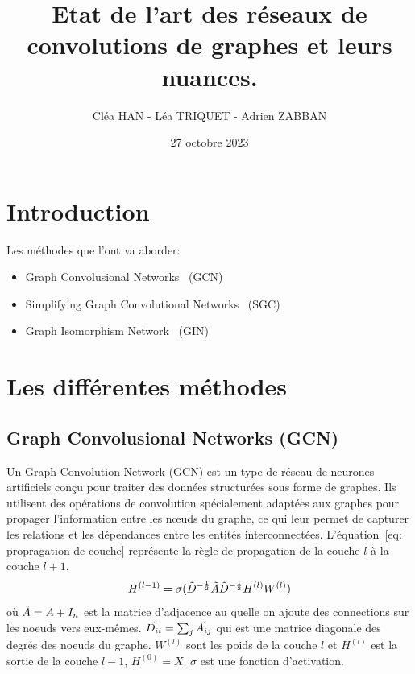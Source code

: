 \documentclass[a4paper]{article}
\title{Etat de l'art des réseaux de convolutions de graphes et leurs nuances.}
\author{Cléa HAN - Léa TRIQUET - Adrien ZABBAN}
\date{27 octobre 2023}
\begin{document}
\maketitle

\section{Introduction}

Les méthodes que l'ont va aborder:
\begin{itemize}
    \item Graph Convolusional Networks~\cite{DBLP:journals/corr/KipfW16} (GCN)
    \item Simplifying Graph Convolutional Networks~\cite{DBLP:journals/corr/abs-1902-07153} (SGC)
    \item Graph Isomorphism Network~\cite{DBLP:journals/corr/abs-1810-00826} (GIN)
\end{itemize}

\section{Les différentes méthodes}

\subsection{Graph Convolusional Networks (GCN)}\label{sec: GCN}
Un Graph Convolution Network (GCN) est un type de réseau de neurones artificiels conçu pour traiter des données 
structurées sous forme de graphes. Ils utilisent des opérations de convolution spécialement adaptées aux graphes 
pour propager l'information entre les nœuds du graphe, ce qui leur permet de capturer les relations et les 
dépendances entre les entités interconnectées. L'équation~\ref{eq: propragation de couche} représente la règle de
propagation de la couche $l$ à la couche $l+1$.
\begin{equation}
    H^{(l-1)} = \sigma (\Tilde{D}^{-\frac{1}{2}} \Tilde{A} \Tilde{D}^{-\frac{1}{2}} H^{(l)} W^{(l)})
    \label{eq: propragation de couche}
\end{equation}
où $\Tilde{A}=A+I_n$ est la matrice d'adjacence au quelle on ajoute des connections sur les noeuds vers 
eux-mêmes. $\Tilde{D_{ii}}=\sum_j{\Tilde{A_{ij}}}$ qui est une matrice diagonale des degrés des noeuds du 
graphe. $W^{(l)}$ sont les poids de la couche $l$ et $H^{(l)}$ est la sortie de la couche $l-1$, $H^{(0)}=X$. 
$\sigma$ est une fonction d'activation.
\end{document}
